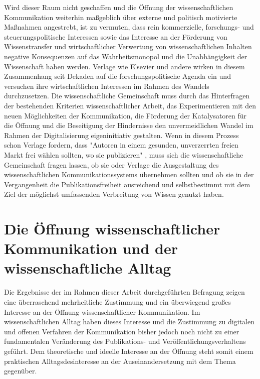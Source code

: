 Wird dieser Raum nicht geschaffen und die Öffnung der wissenschaftlichen Kommunikation weiterhin maßgeblich über externe und politisch motivierte Maßnahmen angestrebt, ist zu vermuten, dass rein kommerzielle, forschungs- und steuerungspolitische Interessen sowie das Interesse an der Förderung von Wissenstransfer und wirtschaftlicher Verwertung von wissenschaftlichen Inhalten negative Konsequenzen auf das Wahrheitsmonopol und die Unabhängigkeit der Wissenschaft haben werden. Verlage wie Elsevier und andere wirken in diesem Zusammenhang seit Dekaden auf die forschungspolitische Agenda ein und versuchen ihre wirtschaftlichen Interessen im Rahmen des Wandels durchzusetzen. Die wissenschaftliche Gemeinschaft muss durch das Hinterfragen der bestehenden Kriterien wissenschaftlicher Arbeit, das Experimentieren mit den neuen Möglichkeiten der Kommunikation, die Förderung der Katalysatoren für die Öffnung und die Beseitigung der Hindernisse den unvermeidlichen Wandel im Rahmen der Digitalisierung eigeninitiativ gestalten. Wenn in diesem Prozess schon Verlage fordern, dass "Autoren in einem gesunden, unverzerrten freien Markt frei wählen sollten, wo sie publizieren" \cite{Brussels_Declaration_2007}, muss sich die wissenschaftliche Gemeinschaft fragen lassen, ob sie oder Verlage die Ausgestaltung des wissenschaftlichen Kommunikationssystems übernehmen sollten und ob sie in der Vergangenheit die Publikationsfreiheit ausreichend und selbstbestimmt mit dem Ziel der möglichst umfassenden Verbreitung von Wissen genutzt haben.

\section{Die Öffnung wissenschaftlicher Kommunikation und der wissenschaftliche Alltag}

Die Ergebnisse der im Rahmen dieser Arbeit durchgeführten Befragung zeigen eine überraschend mehrheitliche Zustimmung und ein überwiegend großes Interesse an der Öffnung wissenschaftlicher Kommunikation. Im wissenschaftlichen Alltag haben dieses Interesse und die Zustimmung zu digitalen und offenen Verfahren der Kommunikation bisher jedoch noch nicht zu einer fundamentalen Veränderung des Publikations- und Veröffentlichungsverhaltens geführt. Dem theoretische und ideelle Interesse an der Öffnung steht somit einem praktischen Alltagsdesinteresse an der Auseinandersetzung mit dem Thema gegenüber.

